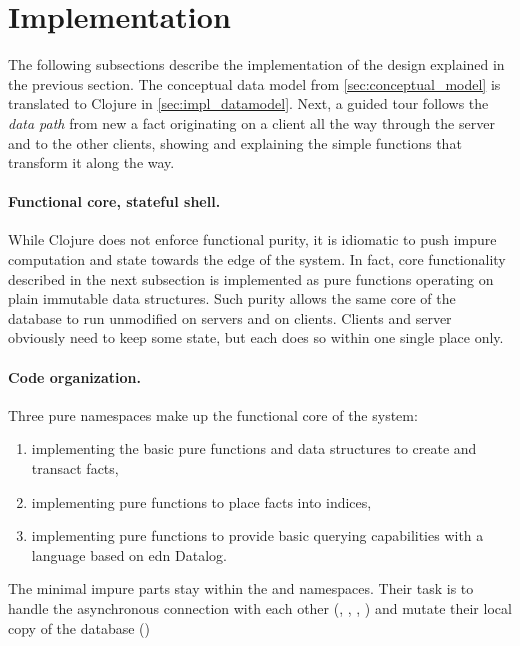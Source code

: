 \section{Implementation}\label{sec:implementation}

The following subsections describe the implementation of the design explained in the previous section. The conceptual data model from \autoref{sec:conceptual_model} is translated to Clojure in \autoref{sec:impl_datamodel}. Next, a guided tour follows the \emph{data path} from new a fact originating on a client all the way through the server and to the other clients, showing and explaining the simple functions that transform it along the way.

\paragraph{Functional core, stateful shell.}
While Clojure does not enforce functional purity, it is idiomatic to push impure computation and state towards the edge of the system. In fact, core functionality described in the next subsection is implemented as pure functions operating on plain immutable data structures. Such purity allows the same core of the database to run unmodified on servers and on clients. Clients and server obviously need to keep some state, but each does so within one single place only.

\paragraph{Code organization.} Three pure namespaces make up the functional core of the system:

\begin{enumerate}[label={(\roman*)}]
  \item {} implementing the basic pure functions and data structures to create and transact facts,
  \item {} implementing pure functions to place facts into indices,
  \item {} implementing pure functions to provide basic querying capabilities with a language based on edn Datalog.
\end{enumerate}

The minimal impure parts stay within the  and  namespaces. Their task is to handle the asynchronous connection with each other (, , , ) and mutate their local copy of the database ()



